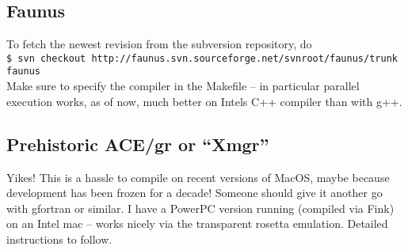 \documentclass[a4paper,10pt]{article}
\begin{document}
\subsection{Faunus}
To fetch the newest revision from the subversion repository, do\\

\verb+$ svn checkout http://faunus.svn.sourceforge.net/svnroot/faunus/trunk faunus+\\

\noindent Make sure to specify the compiler in the Makefile -- in particular parallel execution works, as of now, much better on Intels C++ compiler than with g++.

\subsection{Prehistoric ACE/gr or ``Xmgr''}
Yikes! This is a hassle to compile on recent versions of MacOS, maybe because development has been frozen for a decade! Someone should give it another go with gfortran or similar. I have a PowerPC version running (compiled via Fink) on an Intel mac -- works nicely via the transparent rosetta emulation. Detailed instructions to follow.

\newpage
\end{document}
